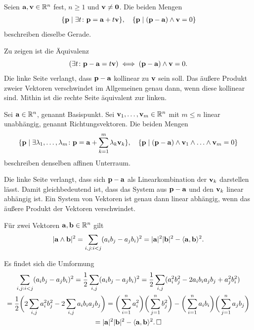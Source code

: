 \begin{Satz}
Seien $\mathbf{a},\mathbf{v}\in\mathbb R^n$ fest, $n\ge 1$ und $\mathbf{v}\ne\mathbf{0}$.
Die beiden Mengen
\begin{gather*}
\{\mathbf{p}\mid \exists t\colon\mathbf{p} = \mathbf{a}+t\mathbf{v}\},\quad
\{\mathbf{p}\mid (\mathbf{p}-\mathbf{a})\wedge\mathbf{v} = 0\}
\end{gather*}
beschreiben dieselbe Gerade.
\end{Satz}
\begin{Beweis}
Zu zeigen ist die Äquivalenz
\[(\exists t\colon\mathbf{p}-\mathbf{a} = t\mathbf{v})\iff (\mathbf{p}-\mathbf{a})\wedge\mathbf{v} = 0.\]
Die linke Seite verlangt, dass $\mathbf{p}-\mathbf{a}$ kollinear zu $\mathbf{v}$ sein
soll. Das äußere Produkt zweier Vektoren verschwindet im Allgemeinen
genau dann, wenn diese kollinear sind. Mithin ist die rechte Seite
äquivalent zur linken.\,\qedsymbol
\end{Beweis}

\begin{Satz}
Sei $\mathbf{a}\in\mathbb R^n$, genannt Basispunkt. Sei $\mathbf{v}_1,\dots,\mathbf{v}_m\in\mathbb R^n$
mit $m\le n$ linear unabhängig, genannt Richtungsvektoren. Die beiden Mengen
\[\{\mathbf{p}\mid\exists\lambda_1,\ldots, \lambda_m\colon \mathbf{p}
= \mathbf{a}+\sum_{k=1}^m \lambda_k\mathbf{v}_k\},\quad
\{\mathbf{p}\mid (\mathbf{p}-\mathbf{a})\wedge\mathbf{v}_1\wedge\ldots\wedge\mathbf{v}_m = 0\}\]
beschreiben denselben affinen Unterraum.
\end{Satz}
\begin{Beweis}
Die linke Seite verlangt, dass sich $\mathbf{p}-\mathbf{a}$ als Linearkombination
der $\mathbf{v}_k$ darstellen lässt. Damit gleichbedeutend ist, dass das
System aus $\mathbf{p}-\mathbf{a}$ und den $\mathbf{v}_k$ linear abhängig ist.
Ein System von Vektoren ist genau dann linear abhängig, wenn das
äußere Produkt der Vektoren verschwindet.\,\qedsymbol
\end{Beweis}

\begin{Satz}\newlinefirst
Für zwei Vektoren $\mathbf{a},\mathbf{b}\in\mathbb R^n$ gilt
\[|\mathbf{a}\wedge\mathbf{b}|^2 = \sum_{i,j:i<j}(a_i b_j - a_j b_i)^2 
= |\mathbf{a}|^2|\mathbf{b}|^2 - \langle\mathbf{a},\mathbf{b}\rangle^2.\]
\end{Satz}
\begin{Beweis}
Es findet sich die Umformung
\begin{gather*}
\sum_{i,j:i<j}(a_i b_j - a_j b_i)^2 = \frac{1}{2}\sum_{i,j}(a_i b_j - a_j b_i)^2
= \frac{1}{2}\sum_{i,j}(a_i^2 b_j^2 - 2a_i b_i a_j b_j + a_j^2 b_i^2)\\
= \frac{1}{2}\bigg(2\sum_{i,j} a_i^2 b_j^2 - 2\sum_{i,j}a_i b_i a_j b_j\bigg)
= \bigg(\sum_{i=1}^n a_i^2\bigg)\bigg(\sum_{j=1}^n b_j^2\bigg)
- \bigg(\sum_{i=1}^n a_i b_i\bigg)\bigg(\sum_{j=1}^n a_j b_j\bigg)\\
= |\mathbf{a}|^2 |\mathbf{b}|^2 - \langle\mathbf{a},\mathbf{b}\rangle^2.\,\square
\end{gather*}
\end{Beweis}

